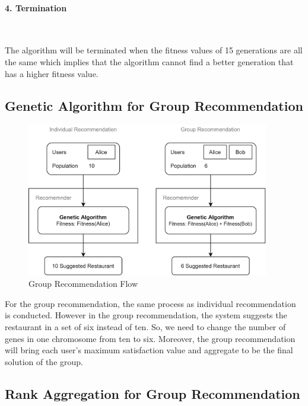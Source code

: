 \documentclass[12pt,oneside,openright,a4paper]{cpe-english-project}
\begin{document}
\paragraph*{4. Termination}\

The algorithm will be terminated when the fitness values of 15 generations are all the same which implies that the algorithm cannot find a better generation that has a higher fitness value.

\subsection{Genetic Algorithm for Group Recommendation}

\begin{figure}[H]\centering
\includegraphics[width=300pt]{./images/3ga_grouprecflow.png}
\caption{Group Recommendation Flow}\label{fig:3ga_grouprecflow}
\end{figure}

For the group recommendation, the same process as individual recommendation is conducted. However in the group recommendation, the system suggests the restaurant in a set of six instead of ten. So, we need to change the number of genes in one chromosome from ten to six. Moreover, the group recommendation will bring each user’s maximum satisfaction value and aggregate to be the final solution of the group.

\subsection{Rank Aggregation for Group Recommendation}

\end{document}
